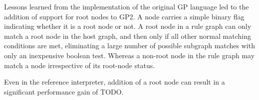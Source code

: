 Lessons learned from the implementation of the original GP language led to the addition of support for root nodes to GP2. A node carries a simple binary flag indicating whether it is a root node or not. A root node in a rule graph can only match a root node in the host graph, and then only if all other normal matching conditions are met, eliminating a large number of possible subgraph matches with only an inexpensive boolean test. Whereas a non-root node in the rule graph may match a node irrespective of its root-node status.


Even in the reference interpreter, addition of a root node can result in a significant performance gain of TODO.

